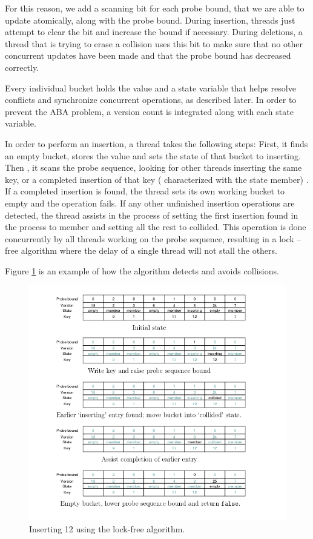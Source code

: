 For this reason, we add a scanning bit for each probe bound, that we are able to update atomically, along with the probe bound. During insertion, threads just attempt to clear the bit and increase the bound if necessary. During deletions, a thread that is trying to erase a collision uses this bit to make sure that no other concurrent  updates have been made and that the probe bound has decreased correctly.

Every individual bucket holds the value and a state variable that helps resolve conflicts and synchronize concurrent operations, as described later. In order to prevent the ABA  problem, a version count is integrated along with each state variable.

In order to perform an insertion, a thread takes the following steps: First, it finds an empty bucket, stores the value and sets the state of that bucket to inserting. Then , it scans the probe sequence, looking for other threads inserting the same key, or a completed insertion of that key  ( characterized with the state member) . If a completed insertion is found, the thread sets its own working bucket to empty and the operation fails. If any other unfinished insertion operations are detected, the thread assists in the process of setting the first insertion found in the process to member and setting all the rest to collided. This operation is done concurrently by all threads working on the probe sequence, resulting in a lock –free algorithm where the delay of a single thread will not stall the others.

Figure \ref{non_blocking_2} is an example of how the algorithm detects and avoids collisions.

\begin{figure}
 \centering
  \includegraphics[scale=0.5]{non_blocking_2.png}
\caption{Inserting 12 using the lock-free algorithm.}
\label{non_blocking_2}
\end{figure}

